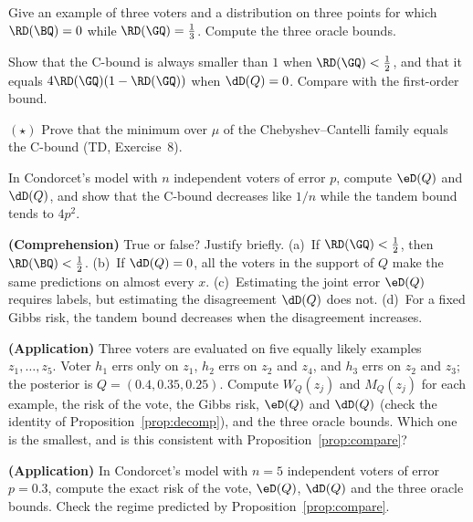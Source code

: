 \begin{exercises}
\begin{exercise}
Give an example of three voters and a distribution on three points for which
$\RD(\BQ)=0$ while $\RD(\GQ)=\frac13$. Compute the three oracle bounds.
\end{exercise}
\begin{exercise}
Show that the C-bound is always smaller than $1$ when $\RD(\GQ)<\frac12$, and that it
equals $4\RD(\GQ)(1-\RD(\GQ))$ when $\dD(Q)=0$. Compare with the first-order bound.
\end{exercise}
\begin{exercise}
$(\star)$ Prove that the minimum over $\mu$ of the Chebyshev--Cantelli family equals the C-bound
(TD, Exercise~8).
\end{exercise}
\begin{exercise}
In Condorcet's model with $n$ independent voters of error $p$, compute $\eD(Q)$
and $\dD(Q)$, and show that the C-bound decreases like $1/n$ while the tandem
bound tends to $4p^2$.
\end{exercise}
\begin{exercise}
\textbf{(Comprehension)} True or false? Justify briefly. (a)~If $\RD(\GQ)<\frac12$, then
$\RD(\BQ)<\frac12$. (b)~If $\dD(Q)=0$, all the voters in the support of $Q$ make the same
predictions on almost every $x$. (c)~Estimating the joint error $\eD(Q)$ requires labels,
but estimating the disagreement $\dD(Q)$ does not. (d)~For a fixed Gibbs risk, the
tandem bound decreases when the disagreement increases.
\end{exercise}
\begin{exercise}
\textbf{(Application)} Three voters are evaluated on five equally likely examples
$z_1,\dots,z_5$. Voter $h_1$ errs only on $z_1$, $h_2$ errs on $z_2$ and $z_4$, and $h_3$ errs
on $z_2$ and $z_3$; the posterior is $Q=(0.4,0.35,0.25)$. Compute $W_Q(z_j)$ and $M_Q(z_j)$
for each example, the risk of the vote, the Gibbs risk, $\eD(Q)$ and $\dD(Q)$ (check the
identity of Proposition~\ref{prop:decomp}), and the three oracle bounds. Which one is the
smallest, and is this consistent with Proposition~\ref{prop:compare}?
\end{exercise}
\begin{exercise}
\textbf{(Application)} In Condorcet's model with $n=5$ independent voters of error $p=0.3$,
compute the exact risk of the vote, $\eD(Q)$, $\dD(Q)$ and the three oracle bounds. Check
the regime predicted by Proposition~\ref{prop:compare}.
\end{exercise}

\end{exercises}
